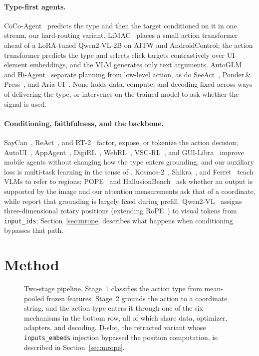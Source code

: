 \documentclass{article}
\begin{document}
\paragraph{Type-first agents.}
CoCo-Agent~\citep{cocoagent} predicts the type and then the target conditioned on it in one stream, our hard-routing variant. LiMAC~\citep{limac} places a small action transformer ahead of a LoRA-tuned Qwen2-VL-2B on AITW and AndroidControl; the action transformer predicts the type and selects click targets contrastively over UI-element embeddings, and the VLM generates only text arguments. AutoGLM~\citep{autoglm} and Hi-Agent~\citep{hiagent} separate planning from low-level action, as do SeeAct~\citep{seeact}, Ponder\,\&\,Press~\citep{ponderpress}, and Aria-UI~\citep{ariaui}. None holds data, compute, and decoding fixed across ways of delivering the type, or intervenes on the trained model to ask whether the signal is used.

\paragraph{Conditioning, faithfulness, and the backbone.}
SayCan~\citep{saycan}, ReAct~\citep{react}, and RT-2~\citep{rt2} factor, expose, or tokenize the action decision; AutoUI~\citep{autoui}, AppAgent~\citep{appagent}, DigiRL~\citep{digirl}, WebRL~\citep{webrl}, VSC-RL~\citep{vscrl}, and GUI-Libra~\citep{guilibra} improve mobile agents without changing how the type enters grounding, and our auxiliary loss is multi-task learning in the sense of \citet{caruana}. Kosmos-2~\citep{kosmos2}, Shikra~\citep{shikra}, and Ferret~\citep{ferret} teach VLMs to refer to regions; POPE~\citep{pope} and HallusionBench~\citep{hallusionbench} ask whether an output is supported by the image and our attention measurements ask that of a coordinate, while \citet{prefill} report that grounding is largely fixed during prefill. Qwen2-VL~\citep{qwen2vl} assigns three-dimensional rotary positions (extending RoPE~\citep{roformer}) to visual tokens from \texttt{input\_ids}; Section~\ref{sec:mrope} describes what happens when conditioning bypasses that path.

\section{Method}
\label{sec:method}

\begin{figure}[t]
  \centering
  \resizebox{0.86\linewidth}{!}{}
  \caption{Two-stage pipeline. Stage~1 classifies the action type from mean-pooled frozen features. Stage~2 grounds the action to a coordinate string, and the action type enters it through one of the six mechanisms in the bottom row, all of which share data, optimizer, adapters, and decoding. D-slot, the retracted variant whose \texttt{inputs\_embeds} injection bypassed the position computation, is described in Section~\ref{sec:mrope}.}
  \label{fig:arch}
\end{figure}
\end{document}
